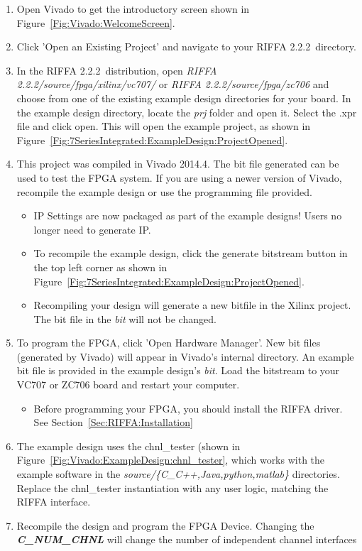 \documentclass{refrep}
\newcommand{\VivadoVer}{2014.4}
\newcommand{\RIFFAVer}{2.2.2}
\newcommand{\Directory}[1]{\textit{#1}}
\newcommand{\RIFFAParameter}[1]{\textit{\textbf{#1}}}
\begin{document}
\begin{enumerate}
\item Open Vivado to get the introductory screen shown in
  Figure~\ref{Fig:Vivado:WelcomeScreen}.
\item Click 'Open an Existing Project' and navigate to your RIFFA
  \RIFFAVer~directory.
\item In the RIFFA \RIFFAVer~distribution, open \Directory{RIFFA
  \RIFFAVer/source/fpga/xilinx/vc707/} or \Directory{RIFFA
  \RIFFAVer/source/fpga/zc706} and choose from one of the existing example
  design directories for your board. In the example design directory, locate the
  \Directory{prj} folder and open it. Select the .xpr file and click open. This
  will open the example project, as shown in
  Figure~\ref{Fig:7SeriesIntegrated:ExampleDesign:ProjectOpened}.
\item This project was compiled in Vivado \VivadoVer. The bit file generated can
  be used to test the FPGA system. If you are using a newer version of Vivado,
  recompile the example design or use the programming file provided.
  \begin{itemize}
  \item IP Settings are now packaged as part of the example designs! Users no
    longer need to generate IP.
  \item To recompile the example design, click the generate bitstream button in
    the top left corner as shown in
    Figure~\ref{Fig:7SeriesIntegrated:ExampleDesign:ProjectOpened}.
  \item Recompiling your design will generate a new bitfile in the Xilinx
    project. The bit file in the \Directory{bit} will not be changed.
  \end{itemize}
\item To program the FPGA, click 'Open Hardware Manager'. New bit files
  (generated by Vivado) will appear in Vivado's internal directory. An example
  bit file is provided in the example design's \Directory{bit}. Load the
  bitstream to your VC707 or ZC706 board and restart your computer.
  \begin{itemize}
  \item Before programming your FPGA, you should install the RIFFA driver. See
    Section~\ref{Sec:RIFFA:Installation}
  \end{itemize}
\item The example design uses the chnl\_tester (shown in
  Figure~\ref{Fig:Vivado:ExampleDesign:chnl_tester}, which works with
  the example software in the \Directory{source/\{C\_C++,Java,python,matlab\}}
  directories. Replace the chnl\_tester instantiation with any user logic,
  matching the RIFFA interface.
\item Recompile the design and program the FPGA Device. Changing the
  \RIFFAParameter{C\_NUM\_CHNL} will change the number of independent channel
  interfaces
\end{enumerate}
\end{document}
